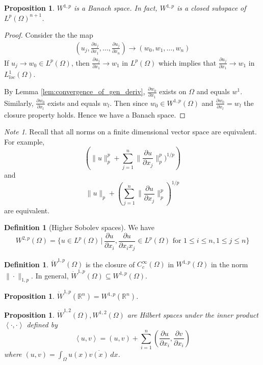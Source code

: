\documentclass[10pt, oneside, reqno]{amsart}
\theoremstyle{plain}%
\newtheorem{prop}[thm]{Proposition}
\numberwithin{equation}{section}
\theoremstyle{definition}
\newtheorem{defn}[thm]{Definition}
\theoremstyle{remark}
\newtheorem*{note}{Note}
\newcommand{\given}{ \, | \,}
\newcommand{\R}{\mathbb{R}}
\newcommand{\iprod}[1]{\left\langle #1 \right\rangle}
\begin{document}
\begin{prop}
    $W^{1, p}$ is a Banach space.  In fact, $W^{1,p}$ is a closed subspace of $L^p(\Omega)^{n+1}$.
\end{prop}

\newcommand{\parder}[2]{\frac{\partial #1}{\partial #2}}
\begin{proof}
    Consider the the map \begin{align*}
        (u_j, \parder{u_j}{x_1}, \dots, \parder{u_j}{x_n}) \rightarrow (w_0, w_1, \dots, w_n)
    \end{align*}  If $u_j \rightarrow w_0 \in L^p(\Omega)$, then $\parder{u_j}{x_1} \rightarrow w_1$ in $L^p(\Omega)$ which implies that $\parder{u_j}{x_1} \rightarrow w_1$ in $L^1_{loc}(\Omega)$.
    
    By Lemma \ref{lem:convergence_of_gen_deriv}, $\parder{w_0}{x_1}$ exists on $\Omega$ and equals $w^1$.  Similarly, $\parder{w_0}{x_l}$ exists and equals $w_l$.  Then since $w_0 \in W^{1, p}(\Omega)$ and $\parder{w_0}{x_l} = w_l$ the closure property holds.  Hence we have a Banach space.
\end{proof}

\begin{note}
    Recall that all norms on a finite dimensional vector space are equivalent.  For example, \[
        \left( \| u \|_p^p + \sum_{j=1}^n \| \parder{u}{x_j}\|_p^p)^{1/p} \right)
    \] and \[
        \| u \|_p + \left( \sum_{j=1}^n \| \parder{u}{x_j} \|_p^p \right)^{1/p}
    \] are equivalent.
\end{note}


\begin{defn}[Higher Sobolev spaces]
    We have \[
    W^{2, p}(\Omega) = \{ u \in L^p(\Omega) \given \frac{\partial u}{\partial x_i}, \parder{u}{x_i x_j} \in L^p(\Omega) \text{ for } 1 \leq i \leq n, 1 \leq j \leq n \}
    \]
\end{defn}

\begin{defn}
    $\dot W^{1, p}(\Omega)$ is the closure of $C^\infty_c(\Omega)$ in $W^{1, p}(\Omega)$ in the norm $\| \cdot \|_{1, p}$.      
    In general, $\dot W^{1, p}(\Omega) \subseteq W^{1, p}(\Omega)$.
\end{defn}

\begin{prop}
    $\dot W^{1, p}(\R^n) = W^{1, p}(\R^n)$.  
\end{prop}

\begin{prop}
    $\dot W^{1, 2}(\Omega), W^{1, 2}(\Omega)$ are Hilbert spaces under the inner product $\iprod{\cdot, \cdot}$ defined by \[
        \iprod{u, v} = (u, v) + \sum_{i=1}^n \left(\parder{u}{x_i}, \parder{v}{x_i}\right)
    \] where $(u, v) = \int_\Omega u(x) \overline{v(x)} \, dx$.
\end{prop}
\end{document}
